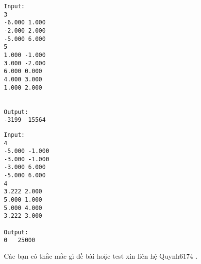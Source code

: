 \begin{verbatim}
Input:
3
-6.000 1.000
-2.000 2.000
-5.000 6.000
5
1.000 -1.000
3.000 -2.000
6.000 0.000
4.000 3.000
1.000 2.000


Output:
-3199  15564
\end{verbatim}
\begin{verbatim}
Input:
4
-5.000 -1.000
-3.000 -1.000
-3.000 6.000
-5.000 6.000
4
3.222 2.000
5.000 1.000
5.000 4.000
3.222 3.000

Output:
0   25000
\end{verbatim}

       Các bạn có thắc mắc gì đề bài hoặc test xin liên hệ Quynh6174 .